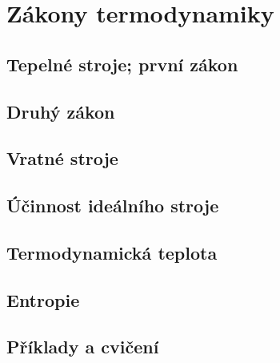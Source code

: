 \chapter{Zákony termodynamiky}\label{fyz:IchapXLIV}
\minitoc
  \section{Tepelné stroje; první zákon}\label{fyz:IchapXLIVsecI}
  \section{Druhý zákon}\label{fyz:IchapXLIVsecII}
  \section{Vratné stroje}\label{fyz:IchapXLIVsecIII}
  \section{Účinnost ideálního stroje}\label{fyz:IchapXLIVsecIV}
  \section{Termodynamická teplota}\label{fyz:IchapXLIVsecV}
  \section{Entropie}\label{fyz:IchapXLIVsecVI}
  \section{Příklady a cvičení}\label{fyz:IchapXLIVsecVII}